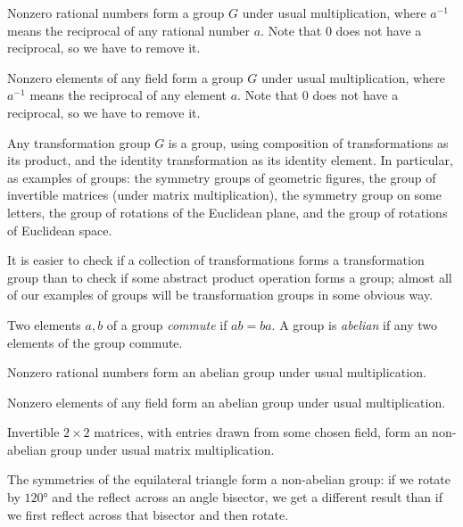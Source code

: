 \begin{example}
Nonzero rational numbers form a group \(G\) under usual multiplication, where \(a^{-1}\) means the reciprocal of any rational number \(a\).
Note that \(0\) does not have a reciprocal, so we have to remove it.
\end{example}
\begin{example}
Nonzero elements of any field form a group \(G\) under usual multiplication, where \(a^{-1}\) means the reciprocal of any element \(a\).
Note that \(0\) does not have a reciprocal, so we have to remove it.
\end{example}
\begin{example}
Any transformation group \(G\) is a group, using composition of transformations as its product, and the identity transformation as its identity element.
In particular, as examples of groups: the symmetry groups of geometric figures, the group of invertible matrices (under matrix multiplication), the symmetry group on some letters, the group of rotations of the Euclidean plane, and the group of rotations of Euclidean space.
\end{example}

It is easier to check if a collection of transformations forms a transformation group than to check if some abstract product operation forms a group; almost all of our examples of groups will be transformation groups in some obvious way.

Two elements \(a,b\) of a group \emph{commute} if \(ab=ba\).
A group is \emph{abelian} if any two elements of the group commute.

\begin{example}
Nonzero rational numbers form an abelian group under usual multiplication.
\end{example}
\begin{example}
Nonzero elements of any field form an abelian group under usual multiplication.
\end{example}
\begin{example}
Invertible \(2 \times 2\) matrices, with entries drawn from some chosen field, form an non-abelian group under usual matrix multiplication.
\end{example}
\begin{example}
The symmetries of the equilateral triangle form a non-abelian group: if we rotate by \(120\si{\degree}\) and the reflect across an angle bisector, we get a different result than if we first reflect across that bisector and then rotate.
\end{example}


